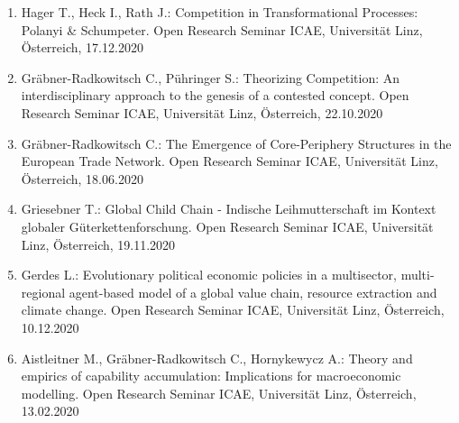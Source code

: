 \begin{enumerate}
	\item Hager T., Heck I., Rath J.: Competition in Transformational Processes: Polanyi & Schumpeter. Open Research Seminar ICAE, Universität Linz, Österreich, 17.12.2020
	\item Gräbner-Radkowitsch C., Pühringer S.: Theorizing Competition: An interdisciplinary approach to the genesis of a contested concept. Open Research Seminar ICAE, Universität Linz, Österreich, 22.10.2020
	\item Gräbner-Radkowitsch C.: The Emergence of Core-Periphery Structures in the European Trade Network. Open Research Seminar ICAE, Universität Linz, Österreich, 18.06.2020
	\item Griesebner T.: Global Child Chain - Indische Leihmutterschaft im Kontext globaler Güterkettenforschung. Open Research Seminar ICAE, Universität Linz, Österreich, 19.11.2020
	\item Gerdes L.: Evolutionary political economic policies in a multisector, multi-regional agent-based model of a global value chain, resource extraction and climate change. Open Research Seminar ICAE, Universität Linz, Österreich, 10.12.2020
	\item Aistleitner M., Gräbner-Radkowitsch C., Hornykewycz A.: Theory and empirics of capability accumulation: Implications for macroeconomic modelling. Open Research Seminar ICAE, Universität Linz, Österreich, 13.02.2020
\end{enumerate}
